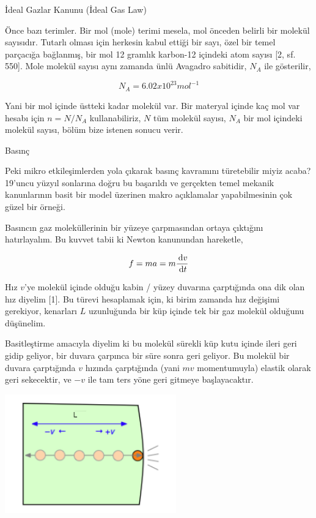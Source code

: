 \documentclass[12pt,fleqn]{article}\usepackage{../../common}
\begin{document}
İdeal Gazlar Kanunu (İdeal Gas Law)

Önce bazı terimler. Bir mol (mole) terimi mesela, mol önceden belirli bir
molekül sayısıdır. Tutarlı olması için herkesin kabul ettiği bir sayı, özel bir
temel parçacığa bağlanmış, bir mol 12 gramlık karbon-12 içindeki atom sayısı
[2, sf. 550]. Mole molekül sayısı aynı zamanda ünlü Avagadro sabitidir,
$N_A$ ile gösterilir,

$$
N_A = 6.02 x 10^{23} mol^{-1}
$$

Yani bir mol içinde üstteki kadar molekül var. Bir materyal içinde kaç mol var
hesabı için $n = N / N_A$ kullanabiliriz, $N$ tüm molekül sayısı, $N_A$ bir mol
içindeki molekül sayısı, bölüm bize istenen sonucu verir.

Basınç

Peki mikro etkileşimlerden yola çıkarak basınç kavramını türetebilir miyiz
acaba? 19'uncu yüzyıl sonlarına doğru bu başarıldı ve gerçekten temel mekanik
kanunlarının basit bir model üzerinen makro açıklamalar yapabilmesinin çok güzel
bir örneği.

Basıncın gaz moleküllerinin bir yüzeye çarpmasından ortaya çıktığını
hatırlayalım. Bu kuvvet tabii ki Newton kanunundan hareketle,

$$
f = m a = m \frac{\,\mathrm{d} v}{\,\mathrm{d} t}
$$

Hız $v$'ye molekül içinde olduğu kabin / yüzey duvarına çarptığında ona dik olan
hız diyelim [1]. Bu türevi hesaplamak için, ki birim zamanda hız değişimi
gerekiyor, kenarları $L$ uzunluğunda bir küp içinde tek bir gaz molekül olduğunu
düşünelim.

Basitleştirme amacıyla diyelim ki bu molekül sürekli küp kutu içinde ileri geri
gidip geliyor, bir duvara çarpınca bir süre sonra geri geliyor. Bu molekül bir
duvara çarptığında $v$ hızında çarptığında (yani $mv$ momentumuyla) elastik
olarak geri sekecektir, ve $-v$ ile tam ters yöne geri gitmeye başlayacaktır.

\includegraphics[width=20em]{phy_005_basics_04.png}
\end{document}
